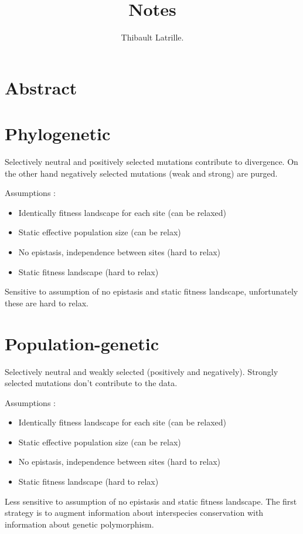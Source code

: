 \documentclass{article}
\author{Thibault Latrille.}
\title{Notes }
\begin{document}
    \maketitle

    \section*{Abstract}


    \tableofcontents
    \newpage

    \section{Phylogenetic}
	Selectively neutral and positively selected mutations contribute to divergence. On the other hand negatively selected mutations (weak and strong) are purged.
	
	Assumptions : 
	\begin{itemize}
		\item Identically fitness landscape for each site (can be relaxed) 
		\item Static effective population size (can be relax)
		\item No epistasis, independence between sites (hard to relax)
		\item Static fitness landscape (hard to relax)
	\end{itemize}
	
	Sensitive to assumption of no epistasis and static fitness landscape, unfortunately these are hard to relax.
	\section{Population-genetic}
	Selectively neutral and weakly selected (positively and negatively). Strongly selected mutations don't contribute to the data.
	
	Assumptions : 
	\begin{itemize}
		\item Identically fitness landscape for each site (can be relaxed) 
		\item Static effective population size (can be relax)
		\item No epistasis, independence between sites (hard to relax)
		\item Static fitness landscape (hard to relax)
	\end{itemize}
	
	Less sensitive to assumption of no epistasis and static fitness landscape. The first strategy is to augment information about interspecies conservation with information about genetic polymorphism.
	
\end{document}
